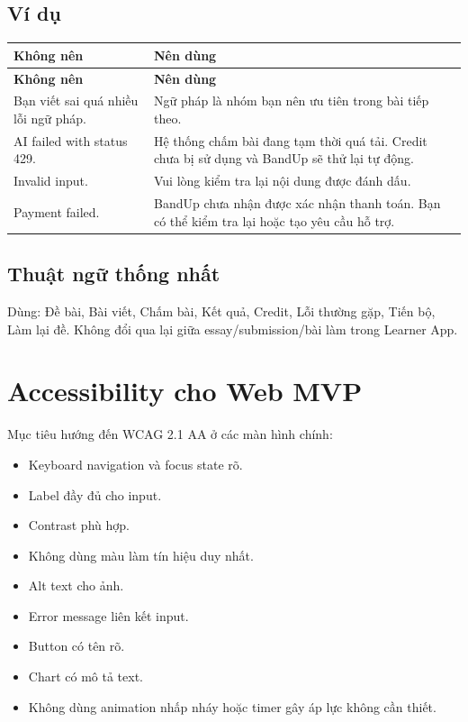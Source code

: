 \documentclass[11pt,a4paper]{article}
\begin{document}
\subsection{Ví dụ}
\begin{longtable}{|P{0.42\textwidth}|P{0.48\textwidth}|}
\hline
\textbf{Không nên} & \textbf{Nên dùng} \\ \hline
\endfirsthead
\hline
\textbf{Không nên} & \textbf{Nên dùng} \\ \hline
\endhead
Bạn viết sai quá nhiều lỗi ngữ pháp. & Ngữ pháp là nhóm bạn nên ưu tiên trong bài tiếp theo. \\ \hline
AI failed with status 429. & Hệ thống chấm bài đang tạm thời quá tải. Credit chưa bị sử dụng và BandUp sẽ thử lại tự động. \\ \hline
Invalid input. & Vui lòng kiểm tra lại nội dung được đánh dấu. \\ \hline
Payment failed. & BandUp chưa nhận được xác nhận thanh toán. Bạn có thể kiểm tra lại hoặc tạo yêu cầu hỗ trợ. \\ \hline
\end{longtable}

\subsection{Thuật ngữ thống nhất}
Dùng: Đề bài, Bài viết, Chấm bài, Kết quả, Credit, Lỗi thường gặp, Tiến bộ, Làm lại đề. Không đổi qua lại giữa essay/submission/bài làm trong Learner App.

\section{Accessibility cho Web MVP}
Mục tiêu hướng đến WCAG 2.1 AA ở các màn hình chính:
\begin{itemize}
  \item Keyboard navigation và focus state rõ.
  \item Label đầy đủ cho input.
  \item Contrast phù hợp.
  \item Không dùng màu làm tín hiệu duy nhất.
  \item Alt text cho ảnh.
  \item Error message liên kết input.
  \item Button có tên rõ.
  \item Chart có mô tả text.
  \item Không dùng animation nhấp nháy hoặc timer gây áp lực không cần thiết.
\end{itemize}
\end{document}

